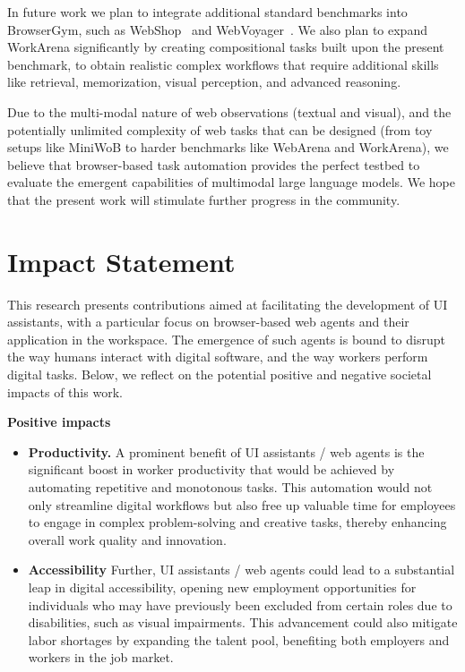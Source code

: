 \documentclass{article}
\theoremstyle{plain}
\theoremstyle{definition}
\theoremstyle{remark}
\newcommand{\paragraphtight}[1]{\textbf{#1~}}
\begin{document}
In future work we plan to integrate additional standard benchmarks into BrowserGym, such as WebShop~\citep{yao2022webshop} and WebVoyager~\citep{he2024webvoyager}. 
We also plan to expand WorkArena significantly by creating compositional tasks built upon the present benchmark, to obtain realistic complex workflows that require additional skills like retrieval, memorization, visual perception, and advanced reasoning.

Due to the multi-modal nature of web observations (textual and visual), and the potentially unlimited complexity of web tasks that can be designed (from toy setups like MiniWoB to harder benchmarks like WebArena and WorkArena), we believe that browser-based task automation provides the perfect testbed to evaluate the emergent capabilities of multimodal large language models. 
We hope that the present work will stimulate further progress in the community. 



\section*{Impact Statement}

This research presents contributions aimed at facilitating the development of UI assistants, with a particular focus on browser-based web agents and their application in the workspace.
The emergence of such agents is bound to disrupt the way humans interact with digital software, and the way workers perform digital tasks.
Below, we reflect on the potential positive and negative societal impacts of this work.

\paragraphtight{Positive impacts}
\begin{itemize}
    \item \textbf{Productivity.} A prominent benefit of UI assistants / web agents is the significant boost in worker productivity that would be achieved by automating repetitive and monotonous tasks. This automation would not only streamline digital workflows but also free up valuable time for employees to engage in complex problem-solving and creative tasks, thereby enhancing overall work quality and innovation.
    \item \textbf{Accessibility} Further, UI assistants / web agents could lead to a substantial leap in digital accessibility, opening new employment opportunities for individuals who may have previously been excluded from certain roles due to disabilities, such as visual impairments. This advancement could also mitigate labor shortages by expanding the talent pool, benefiting both employers and workers in the job market.
\end{itemize}
\end{document}
